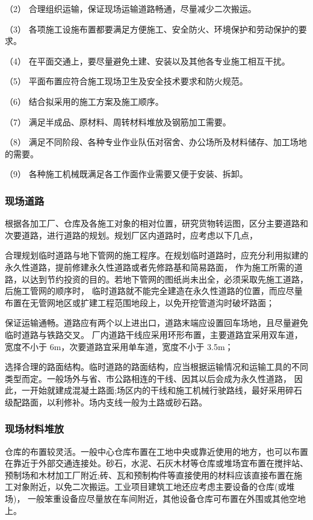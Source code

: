（2） 合理组织运输，保证现场运输道路畅通，尽量减少二次搬运。

（3） 各项施工设施布置都要满足方便施工、安全防火、环境保护和劳动保护的要求。

（4） 在平面交通上，要尽量避免土建、安装以及其他各专业施工相互干扰。

（5） 平面布置应符合施工现场卫生及安全技术要求和防火规范。

（6） 结合拟采用的施工方案及施工顺序。

（7） 满足半成品、原材料、周转材料堆放及钢筋加工需要。

（8） 满足不同阶段、各种专业作业队伍对宿舍、办公场所及材料储存、加工场地的需要。

（9） 各种施工机械既满足各工作面作业需要又便于安装、拆卸。

\subsubsection{现场道路}

根据各加工厂、仓库及各施工对象的相对位置，研究货物转运图，区分主要道路和次要道路，进行道路的规划。规划厂区内道路时，应考虑以下几点，

 合理规划临时道路与地下管网的施工程序。在规划临时道路时，应充分利用拟建的永久性道路，提前修建永久性道路或者先修路基和简易路面，
作为施工所需的道路，以达到节约投资的目的。若地下管网的图纸尚未出全，必须采取先施工道路，后施工管网的顺序时，
临时道路就不能完全建造在永久性道路的位置，而应尽量布置在无管网地区或扩建工程范围地段上，以免开挖管道沟时破坏路面；

 保证运输通畅。道路应有两个以上进出口，道路末端应设置回车场地，且尽量避免临时道路与铁路交叉。
厂内道路干线应采用环形布置，主要道路宜采用双车道，宽度不小于 6m，次要道路宜采用单车道，宽度不小于 3.5m；

 选择合理的路面结构。临时道路的路面结构，应当根据运输情况和运输工具的不同类型而定。一般场外与省、市公路相连的干线、因其以后会成为永久性道路，
因此，一开始就建成混凝土路面;场区内的干线和施工机械行驶路线，最好采用碎石级配路面，以利修补。场内支线一般为土路或砂石路。

\subsubsection{现场材料堆放}


仓库的布置较灵活。一般中心仓库布置在工地中央或靠近使用的地方，也可以布置在靠近于外部交通连接处。砂石，水泥、石灰木材等仓库或堆场宜布置在搅拌站、
预制场和木材加工厂附近;砖、瓦和预制构件等直接使用的材料应该直接布置在施工对象附近，以免二次搬运。工业项目建筑工地还应考虑主要设备的仓库(或堆场)，
一般笨重设备应尽量放在车间附近，其他设备仓库可布置在外围或其他空地上。

